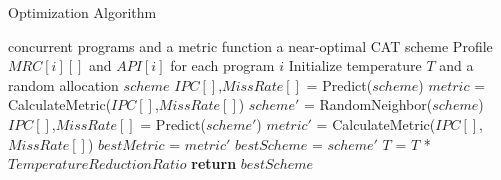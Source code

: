 \begin{algorithm}
\caption{Optimization Algorithm}
\label{alg:opt}
\begin{algorithmic}[1]
\renewcommand{\algorithmicforall}{\textbf{foreach}}
\renewcommand{\algorithmicrequire}{\textbf{Input:}}
\renewcommand{\algorithmicensure}{\textbf{Output:}}
\REQUIRE concurrent programs and a metric function
\ENSURE a near-optimal CAT scheme
\STATE Profile $MRC[i][]$ and $API[i]$ for each program $i$
\STATE Initialize temperature $T$ and a random allocation $scheme$
\STATE $IPC[]$,$MissRate[]$ = Predict($scheme$)
\STATE $metric$ = CalculateMetric($IPC[]$,$MissRate[]$)
	\STATE $scheme'$ = RandomNeighbor($scheme$)
    \STATE $IPC[]$,$MissRate[]$ = Predict($scheme'$)
    \STATE $metric'$ = CalculateMetric($IPC[]$,$MissRate[]$)
    	\STATE $bestMetric$ = $metric'$ 
        \STATE $bestScheme$ = $scheme'$
    \ENDIF
    \ELSE
    \ENDIF
    \ENDIF
    \STATE $T$ = $T$ * $TemperatureReductionRatio$
\ENDWHILE
\STATE \textbf{return} $bestScheme$

\end{algorithmic}
\end{algorithm}
